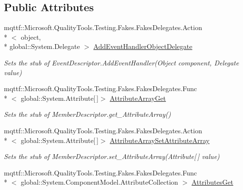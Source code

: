 \subsection*{Public Attributes}
\begin{DoxyCompactItemize}
\item 
mqttf\-::\-Microsoft.\-Quality\-Tools.\-Testing.\-Fakes.\-Fakes\-Delegates.\-Action\\*
$<$ object, \\*
global\-::\-System.\-Delegate $>$ \hyperlink{class_system_1_1_component_model_1_1_fakes_1_1_stub_event_descriptor_a3fd3a9695efc327497c008356a7371e7}{Add\-Event\-Handler\-Object\-Delegate}
\begin{DoxyCompactList}\small\item\em Sets the stub of Event\-Descriptor.\-Add\-Event\-Handler(\-Object component, Delegate value)\end{DoxyCompactList}\item 
mqttf\-::\-Microsoft.\-Quality\-Tools.\-Testing.\-Fakes.\-Fakes\-Delegates.\-Func\\*
$<$ global\-::\-System.\-Attribute\mbox{[}$\,$\mbox{]}$>$ \hyperlink{class_system_1_1_component_model_1_1_fakes_1_1_stub_event_descriptor_ab33953e16d035094f599fd1c5e5e66f3}{Attribute\-Array\-Get}
\begin{DoxyCompactList}\small\item\em Sets the stub of Member\-Descriptor.\-get\-\_\-\-Attribute\-Array()\end{DoxyCompactList}\item 
mqttf\-::\-Microsoft.\-Quality\-Tools.\-Testing.\-Fakes.\-Fakes\-Delegates.\-Action\\*
$<$ global\-::\-System.\-Attribute\mbox{[}$\,$\mbox{]}$>$ \hyperlink{class_system_1_1_component_model_1_1_fakes_1_1_stub_event_descriptor_a84efecb2111f32467e640d575e5c85c1}{Attribute\-Array\-Set\-Attribute\-Array}
\begin{DoxyCompactList}\small\item\em Sets the stub of Member\-Descriptor.\-set\-\_\-\-Attribute\-Array(\-Attribute\mbox{[}$\,$\mbox{]} value)\end{DoxyCompactList}\item 
mqttf\-::\-Microsoft.\-Quality\-Tools.\-Testing.\-Fakes.\-Fakes\-Delegates.\-Func\\*
$<$ global\-::\-System.\-Component\-Model.\-Attribute\-Collection $>$ \hyperlink{class_system_1_1_component_model_1_1_fakes_1_1_stub_event_descriptor_a2dde32e0494851d326b2499fe969ee70}{Attributes\-Get}

\end{DoxyCompactItemize}
